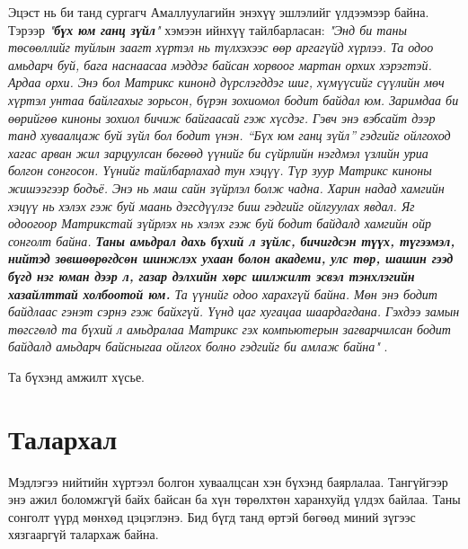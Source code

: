 \documentclass[10pt,twocolumn,letterpaper]{article}
\begin{document}
Эцэст нь би танд сургагч Амаллуулагийн энэхүү эшлэлийг үлдээмээр байна. Тэрээр \textit{"\textbf{бүх юм ганц зүйл}"} хэмээн ийнхүү тайлбарласан: \textit{"Энд би таны төсөөллийг туйлын заагт хүртэл нь түлхэхээс өөр аргагүйд хүрлээ. Та одоо амьдарч буй, бага наснаасаа мэддэг байсан хорвоог мартан орхих хэрэгтэй. Ардаа орхи. Энэ бол Матрикс кинонд дүрслэгддэг шиг, хүмүүсийг сүүлийн мөч хүртэл унтаа байлгахыг зорьсон, бүрэн зохиомол бодит байдал юм. Заримдаа би өөрийгөө киноны зохиол бичиж байгаасай гэж хүсдэг. Гэвч энэ вэбсайт дээр танд хуваалцаж буй зүйл бол бодит үнэн. “Бүх юм ганц зүйл” гэдгийг ойлгоход хагас арван жил зарцуулсан бөгөөд үүнийг би сүйрлийн нэгдмэл үзлийн уриа болгон сонгосон. Үүнийг тайлбарлахад тун хэцүү. Түр зуур Матрикс киноны жишээгээр бодъё. Энэ нь маш сайн зүйрлэл болж чадна. Харин надад хамгийн хэцүү нь хэлэх гэж буй маань дэгсдүүлэг биш гэдгийг ойлгуулах явдал. Яг одоогоор Матрикстай зүйрлэх нь хэлэх гэж буй бодит байдалд хамгийн ойр сонголт байна. \textbf{Таны амьдрал дахь бүхий л зүйлс, бичигдсэн түүх, түгээмэл, нийтэд зөвшөөрөгдсөн шинжлэх ухаан болон академи, улс төр, шашин гээд бүгд нэг юман дээр л, газар дэлхийн хөрс шилжилт эсвэл тэнхлэгийн хазайлттай холбоотой юм.} Та үүнийг одоо харахгүй байна. Мөн энэ бодит байдлаас гэнэт сэрнэ гэж байхгүй. Үүнд цаг хугацаа шаардагдана. Гэхдээ замын төгсгөлд та бүхий л амьдралаа Матрикс гэх компьютерын загварчилсан бодит байдалд амьдарч байсныгаа ойлгох болно гэдгийг би амлаж байна"} \cite{33,34}.

Та бүхэнд амжилт хүсье.

\section{Талархал}

Мэдлэгээ нийтийн хүртээл болгон хуваалцсан хэн бүхэнд баярлалаа. Тангүйгээр энэ ажил боломжгүй байх байсан ба хүн төрөлхтөн харанхуйд үлдэх байлаа. Таны сонголт үүрд мөнхөд цэцэглэнэ. Бид бүгд танд өртэй бөгөөд миний зүгээс хязгааргүй талархаж байна.

\clearpage
\twocolumn

{\small


}
\end{document}
